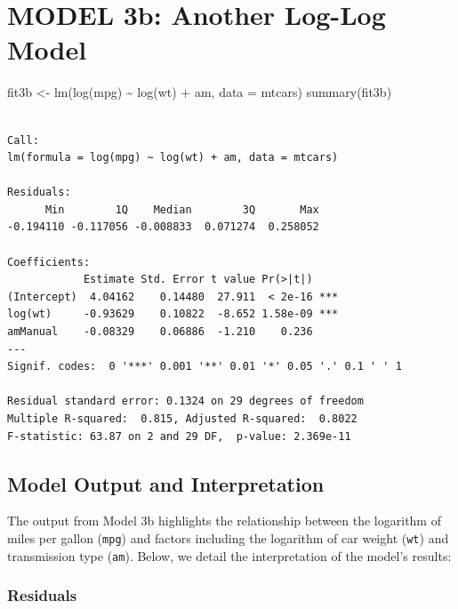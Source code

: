 \documentclass[
  letterpaper,
  DIV=11,
  numbers=noendperiod]{scrreport}
\newenvironment{Shaded}{\begin{snugshade}}{\end{snugshade}}
\newcommand{\AttributeTok}[1]{\textcolor[rgb]{0.40,0.45,0.13}{#1}}
\newcommand{\FunctionTok}[1]{\textcolor[rgb]{0.28,0.35,0.67}{#1}}
\newcommand{\NormalTok}[1]{\textcolor[rgb]{0.00,0.23,0.31}{#1}}
\newcommand{\OtherTok}[1]{\textcolor[rgb]{0.00,0.23,0.31}{#1}}
\newcommand{\SpecialCharTok}[1]{\textcolor[rgb]{0.37,0.37,0.37}{#1}}
\begin{document}
\section{MODEL 3b: Another Log-Log
Model}\label{model-3b-another-log-log-model}

\begin{Shaded}
\begin{Highlighting}[]
\NormalTok{fit3b }\OtherTok{\textless{}{-}} \FunctionTok{lm}\NormalTok{(}\FunctionTok{log}\NormalTok{(mpg) }\SpecialCharTok{\textasciitilde{}} \FunctionTok{log}\NormalTok{(wt) }\SpecialCharTok{+}\NormalTok{ am, }\AttributeTok{data =}\NormalTok{ mtcars)}
\FunctionTok{summary}\NormalTok{(fit3b)}
\end{Highlighting}
\end{Shaded}

\begin{verbatim}

Call:
lm(formula = log(mpg) ~ log(wt) + am, data = mtcars)

Residuals:
      Min        1Q    Median        3Q       Max 
-0.194110 -0.117056 -0.008833  0.071274  0.258052 

Coefficients:
            Estimate Std. Error t value Pr(>|t|)    
(Intercept)  4.04162    0.14480  27.911  < 2e-16 ***
log(wt)     -0.93629    0.10822  -8.652 1.58e-09 ***
amManual    -0.08329    0.06886  -1.210    0.236    
---
Signif. codes:  0 '***' 0.001 '**' 0.01 '*' 0.05 '.' 0.1 ' ' 1

Residual standard error: 0.1324 on 29 degrees of freedom
Multiple R-squared:  0.815, Adjusted R-squared:  0.8022 
F-statistic: 63.87 on 2 and 29 DF,  p-value: 2.369e-11
\end{verbatim}

\subsection{Model Output and
Interpretation}\label{model-output-and-interpretation-1}

The output from Model 3b highlights the relationship between the
logarithm of miles per gallon (\texttt{mpg}) and factors including the
logarithm of car weight (\texttt{wt}) and transmission type
(\texttt{am}). Below, we detail the interpretation of the model's
results:

\subsubsection{Residuals}\label{residuals-1}
\end{document}
